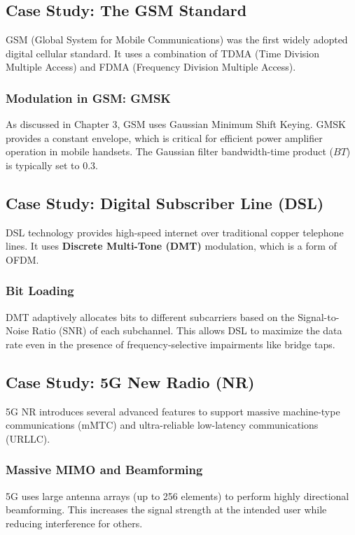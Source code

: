 
\subsection{Case Study: The GSM Standard}
GSM (Global System for Mobile Communications) was the first widely adopted digital cellular standard. It uses a combination of TDMA (Time Division Multiple Access) and FDMA (Frequency Division Multiple Access).

\subsubsection{Modulation in GSM: GMSK}
As discussed in Chapter 3, GSM uses Gaussian Minimum Shift Keying. GMSK provides a constant envelope, which is critical for efficient power amplifier operation in mobile handsets. The Gaussian filter bandwidth-time product ($BT$) is typically set to 0.3.

\subsection{Case Study: Digital Subscriber Line (DSL)}
DSL technology provides high-speed internet over traditional copper telephone lines. It uses \textbf{Discrete Multi-Tone (DMT)} modulation, which is a form of OFDM.

\subsubsection{Bit Loading}
DMT adaptively allocates bits to different subcarriers based on the Signal-to-Noise Ratio (SNR) of each subchannel. This allows DSL to maximize the data rate even in the presence of frequency-selective impairments like bridge taps.

\subsection{Case Study: 5G New Radio (NR)}
5G NR introduces several advanced features to support massive machine-type communications (mMTC) and ultra-reliable low-latency communications (URLLC).

\subsubsection{Massive MIMO and Beamforming}
5G uses large antenna arrays (up to 256 elements) to perform highly directional beamforming. This increases the signal strength at the intended user while reducing interference for others.

